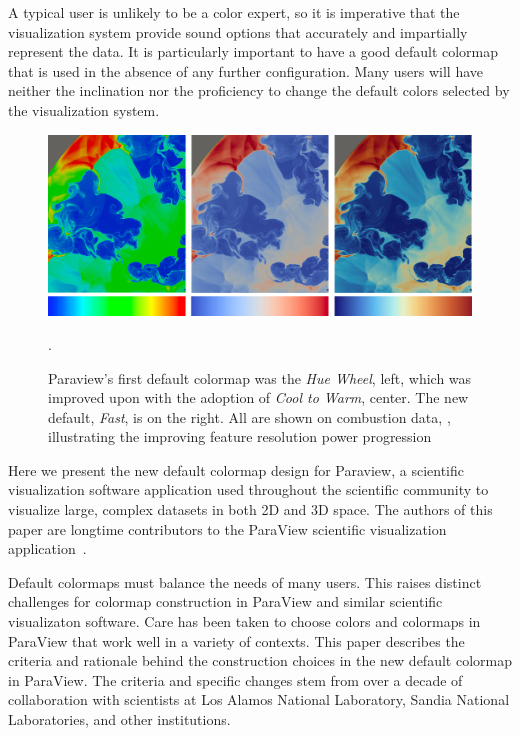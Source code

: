 \documentclass{IEEEcsmag}
\newcommand*{\colormap}[1]{\textsl{#1}\xspace}
\newcommand*{\huewheel}{\colormap{Hue Wheel}}
\newcommand*{\coolwarm}{\colormap{Cool to Warm}}
\newcommand*{\fast}{\colormap{Fast}}
\begin{document}
 A typical user is unlikely to be a color expert, so it is imperative that the visualization system provide sound options that accurately and impartially represent the data. It is particularly important to have a good default colormap that is used in the absence of any further configuration. Many users will have neither the inclination nor the proficiency to change the default colors selected by the visualization system.

  
\begin{figure}[htb]
\centering
\includegraphics[width=\textwidth]{Final_Pics/Larsen_the3.png}
\caption{Paraview's first default colormap was the \huewheel, left, which was improved upon with the adoption of \coolwarm, center. The new default, \fast, is on the right. All are shown on combustion data, \cite{Larsen}, illustrating the improving feature resolution power progression}.
\label{Larsen3}
\end{figure}

Here we present the new default colormap design for Paraview, a scientific visualization software application used throughout the scientific community to visualize large, complex datasets in both 2D and 3D space. The authors of this paper are longtime contributors to the ParaView scientific visualization application~\cite{Ahrens2005}.

Default colormaps must balance the needs of many users. This raises distinct challenges for colormap construction in ParaView and similar scientific visualizaton software.
Care has been taken to choose colors and colormaps in ParaView that work well in a variety of contexts.
This paper describes the criteria and rationale behind the construction choices in the new default colormap in ParaView.
The criteria and specific changes stem from over a decade of collaboration with scientists at Los Alamos National Laboratory, Sandia National Laboratories, and other institutions.
\end{document}
